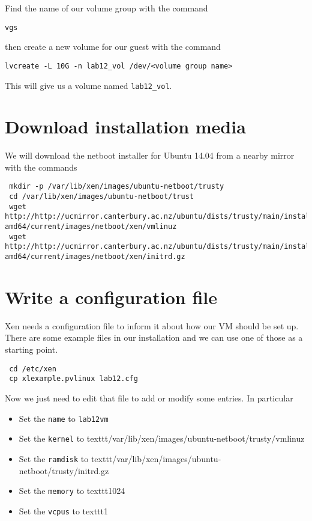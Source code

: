 \documentclass{article}
\begin{document}
 Find the name of our volume group with the command
 
 \texttt{vgs}
 
 then create a new volume for our guest with the command 
 
 \texttt{lvcreate -L 10G -n lab12\_vol /dev/<volume group name>}
 
 This will give us a volume named \texttt{lab12\_vol}.

 \section{Download installation media}
 We will download the netboot installer for Ubuntu 14.04 from a nearby mirror with the commands
 
 \begin{verbatim}
 mkdir -p /var/lib/xen/images/ubuntu-netboot/trusty
 cd /var/lib/xen/images/ubuntu-netboot/trust
 wget http://http://ucmirror.canterbury.ac.nz/ubuntu/dists/trusty/main/installer-amd64/current/images/netboot/xen/vmlinuz
 wget http://http://ucmirror.canterbury.ac.nz/ubuntu/dists/trusty/main/installer-amd64/current/images/netboot/xen/initrd.gz
 \end{verbatim}
 
 \section{Write a configuration file}
 Xen needs a configuration file to inform it about how our VM should be set up. There are some example files in our installation
 and we can use one of those as a starting point.
 
 \begin{verbatim}
 cd /etc/xen
 cp xlexample.pvlinux lab12.cfg
 \end{verbatim}
 
 Now we just need to edit that file to add or modify some entries. In particular
 
 \begin{itemize}
  \item Set the \texttt{name} to \texttt{lab12vm}
  \item Set the \texttt{kernel} to texttt{/var/lib/xen/images/ubuntu-netboot/trusty/vmlinuz}
  \item Set the \texttt{ramdisk} to texttt{/var/lib/xen/images/ubuntu-netboot/trusty/initrd.gz}
  \item Set the \texttt{memory} to texttt{1024}
   \item Set the \texttt{vcpus} to texttt{1}
 \end{itemize}
 
\end{document}
